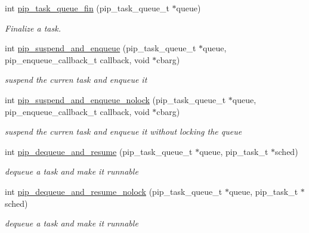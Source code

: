 \begin{DoxyCompactItemize}
\item 
int \hyperlink{group__libpip_ga45d0eaa7122e459ea19187c148b9da10}{pip\-\_\-task\-\_\-queue\-\_\-fin} (pip\-\_\-task\-\_\-queue\-\_\-t $\ast$queue)
\begin{DoxyCompactList}\small\item\em Finalize a task. \end{DoxyCompactList}\end{DoxyCompactItemize}
\begin{DoxyCompactItemize}
\item 
int \hyperlink{group__libpip_ga7dbf7e64e78cd00ef62c3bb04f289a68}{pip\-\_\-suspend\-\_\-and\-\_\-enqueue} (pip\-\_\-task\-\_\-queue\-\_\-t $\ast$queue, pip\-\_\-enqueue\-\_\-callback\-\_\-t callback, void $\ast$cbarg)
\begin{DoxyCompactList}\small\item\em suspend the curren task and enqueue it \end{DoxyCompactList}\end{DoxyCompactItemize}
\begin{DoxyCompactItemize}
\item 
int \hyperlink{group__libpip_gab78d289ab89fa2981f2910849b1b2df7}{pip\-\_\-suspend\-\_\-and\-\_\-enqueue\-\_\-nolock} (pip\-\_\-task\-\_\-queue\-\_\-t $\ast$queue, pip\-\_\-enqueue\-\_\-callback\-\_\-t callback, void $\ast$cbarg)
\begin{DoxyCompactList}\small\item\em suspend the curren task and enqueue it without locking the queue \end{DoxyCompactList}\end{DoxyCompactItemize}
\begin{DoxyCompactItemize}
\item 
int \hyperlink{group__libpip_gaaff299f195e2397f17cf11016c8a394f}{pip\-\_\-dequeue\-\_\-and\-\_\-resume} (pip\-\_\-task\-\_\-queue\-\_\-t $\ast$queue, pip\-\_\-task\-\_\-t $\ast$sched)
\begin{DoxyCompactList}\small\item\em dequeue a task and make it runnable \end{DoxyCompactList}\end{DoxyCompactItemize}
\begin{DoxyCompactItemize}
\item 
int \hyperlink{group__libpip_gab3c26770ac6de70ad11239dc301bd403}{pip\-\_\-dequeue\-\_\-and\-\_\-resume\-\_\-nolock} (pip\-\_\-task\-\_\-queue\-\_\-t $\ast$queue, pip\-\_\-task\-\_\-t $\ast$sched)
\begin{DoxyCompactList}\small\item\em dequeue a task and make it runnable \end{DoxyCompactList}\end{DoxyCompactItemize}
